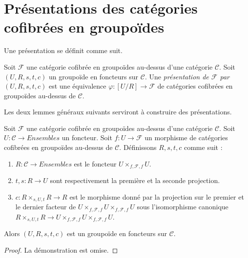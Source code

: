 \section{Présentations des catégories cofibrées en groupoïdes}
\label{section-presentation-categories-cofibred-in-groupoids}

\noindent
Une présentation se définit comme suit.

\begin{definition}
\label{definition-presentation}
Soit $\mathcal{F}$ une catégorie cofibrée en groupoïdes au-dessus d'une
catégorie $\mathcal{C}$. Soit $(U, R, s, t, c)$ un groupoïde en foncteurs sur
$\mathcal{C}$. Une {\it présentation de $\mathcal{F}$ par
$(U, R, s, t, c)$} est une équivalence
$\varphi : [U/R] \to \mathcal{F}$ de catégories cofibrées en groupoïdes
au-dessus de $\mathcal{C}$.
\end{definition}

\noindent
Les deux lemmes généraux suivants serviront à construire des présentations.

\begin{lemma}
\label{lemma-presentation-construction}
Soit $\mathcal{F}$ une catégorie cofibrée en groupoïdes au-dessus d'une
catégorie $\mathcal{C}$. Soit $U : \mathcal{C} \to \textit{Ensembles}$ un
foncteur. Soit $f : U \to \mathcal{F}$ un morphisme de catégories cofibrées
en groupoïdes au-dessus de $\mathcal{C}$. Définissons $R, s, t, c$ comme suit :
\begin{enumerate}
\item $R : \mathcal{C} \to \textit{Ensembles}$ est le foncteur
$U \times_{f, \mathcal{F}, f} U$.
\item $t, s : R \to U$ sont respectivement la première et la seconde
projection.
\item $c : R \times_{s, U, t} R \to R$ est le morphisme donné par la
projection sur le premier et le dernier facteur de
$U \times_{f, \mathcal{F}, f} U \times_{f, \mathcal{F}, f} U$
sous l'isomorphisme canonique
$R \times_{s, U, t} R \to
U \times_{f, \mathcal{F}, f} U \times_{f, \mathcal{F}, f} U$.
\end{enumerate}
Alors $(U, R, s, t, c)$ est un groupoïde en foncteurs sur $\mathcal{C}$.
\end{lemma}

\begin{proof}
La démonstration est omise.
\end{proof}

